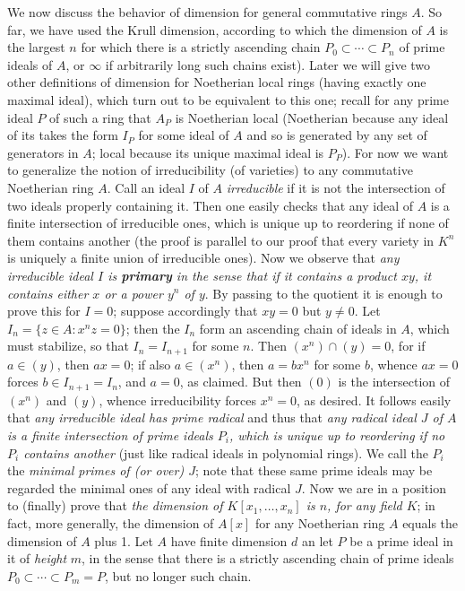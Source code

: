 \documentclass[10pt]{article}
\begin{document}
We now discuss the behavior of dimension for general commutative rings
$A$. So far, we have used the Krull dimension, according to which the
dimension of $A$ is the largest $n$ for which there is a strictly
ascending chain $P_0\subset\cdots\subset P_n$ of prime ideals of $A$, or
$\infty$ if arbitrarily long such chains exist). Later we will give two
other definitions of dimension for Noetherian local rings (having
exactly one maximal ideal), which turn out to be equivalent to this one;
recall for any prime ideal $P$ of such a ring that $A_P$ is Noetherian
local (Noetherian because any ideal of its takes the form $I_P$ for some
ideal of $A$ and so is generated by any set of generators in $A$; local
because its unique maximal ideal is $P_P$). For now we want to
generalize the notion of irreducibility (of varieties) to any
commutative Noetherian ring $A$. Call an ideal $I$ of $A$ {\sl
  irreducible} if it is not the intersection of two ideals properly
containing it. Then one easily checks that any ideal of $A$ is a finite
intersection of irreducible ones, which is unique up to reordering if
none of them contains another (the proof is parallel to our proof that
every variety in $K^n$ is uniquely a finite union of irreducible ones).
Now we observe that {\sl any irreducible ideal $I$ is {\bf primary} in
  the sense that if it contains a product $xy$, it contains either $x$
  or a power $y^n$ of $y$}. By passing to the quotient it is enough to
prove this for $I=0$; suppose accordingly that $xy=0$ but $y\ne0$. Let
$I_n = \{z\in A: x^nz = 0\}$; then the $I_n$ form an ascending chain of
ideals in $A$, which must stabilize, so that $I_n = I_{n+1}$ for some
$n$. Then $(x^n)\cap (y) = 0$, for if $a\in (y)$, then $ax = 0$; if also
$a\in (x^n)$, then $a=bx^n$ for some $b$, whence $ax = 0$ forces $b\in
I_{n+1} = I_n$, and $a=0$, as claimed. But then $(0)$ is the
intersection of $(x^n)$ and $(y)$, whence irreducibility forces $x^n =
0$, as desired. It follows easily that {\sl any irreducible ideal has
  prime radical} and thus that {\sl any radical ideal $J$ of $A$ is a
  finite intersection of prime ideals $P_i$, which is unique up to
  reordering if no $P_i$ contains another} (just like radical ideals in
polynomial rings). We call the $P_i$ the {\sl minimal primes of (or
  over) $J$}; note that these same prime ideals may be regarded the
minimal ones of any ideal with radical $J$. Now we are in a position to
(finally) prove that {\sl the dimension of $K[x_1,\ldots,x_n]$ is $n$,
  for any field $K$}; in fact, more generally, the dimension of $A[x]$
for any Noetherian ring $A$ equals the dimension of $A$ plus 1. Let $A$
have finite dimension $d$ an let $P$ be a prime ideal in it of {\sl
  height} $m$, in the sense that there is a strictly ascending chain of
prime ideals $P_0\subset\cdots\subset P_m=P$, but no longer such chain.
\end{document}
